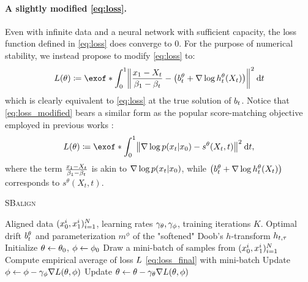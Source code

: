 \paragraph{A slightly modified \eqref{eq:loss}.}
Even with infinite data and a neural network with sufficient capacity, the loss function defined in \eqref{eq:loss} does converge to 0. For the purpose of numerical stability, we instead propose to modify \eqref{eq:loss} to:
\begin{equation}
\label{eq:loss_modified}
\Loss(\theta) \defeq \exof*{\int_0^1 \norm*{\frac{\x_1-X_t}{\cvolat[\horizon]-\cvolat[\ctime]}- \left(\fdrift^\theta + \nabla \log \doob^\theta(X_t)\right)}^2 \dt  }
\end{equation}which is clearly equivalent to \eqref{eq:loss} at the true solution of $\fdrift$. Notice that \eqref{eq:loss_modified} bears a similar form as the popular score-matching objective employed in previous works \citep{song2019generative,song2020score}:
\begin{equation}
\label{eq:score_matching}
\Loss(\theta) \defeq \exof*{\int_0^1 \norm*{\nabla \log p(\x_t | \x_0)- s^\theta(X_t, t)}^2 \dt  },
\end{equation}
where the term $\frac{\x_1-X_t}{\cvolat[\horizon]-\cvolat[\ctime]}$ is akin to $\nabla \log p(\x_t | \x_0)$, while $\left(\fdrift^\theta + \nabla \log \doob^\theta(X_t)\right)$ corresponds to $s^\theta(X_t, t)$. 

 \begin{algorithm}[t]
   \caption{\textsc{SBalign}}
   \label{alg:SBalign}
\begin{algorithmic}
    Aligned data $(\x^i_0,\x^i_1)_{i=1}^N$, learning rates $\lrf,\lrb$, training iterations $K$. %
    Optimal drift $\fdrift^\theta$ and parameterization $m^{\phi}$ of the "softened" Doob's $h$-transform $\doobs$
\smallskip
   \STATE Initialize $\paramf \subs \paramf_0$, $\paramb \subs \paramb_0$
   \STATE Draw a mini-batch of samples from $(\x^i_0,\x^i_1)_{i=1}^N$
   \STATE Compute empirical average of loss $\Loss$ \eqref{eq:loss_final} with mini-batch
   \STATE Update $\paramb \subs \paramb - \lrb\nabla \Loss(\theta,\phi)$
   \STATE Update $\paramf \subs \paramf - \lrf\nabla \Loss(\theta,\phi)$
   \ENDFOR
\end{algorithmic}
\end{algorithm}

